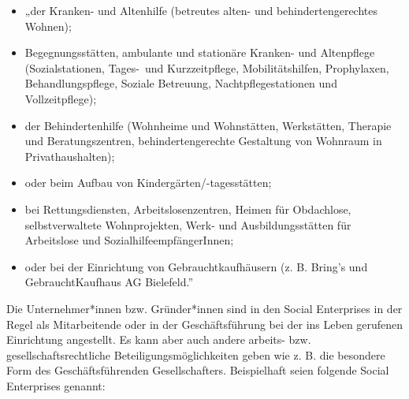 \documentclass[
  letterpaper,
]{book}
\begin{document}
\begin{itemize}
\item
  „der Kranken- und Altenhilfe (betreutes alten- und
  behindertengerechtes Wohnen);
\item
  Begegnungsstätten, ambulante und stationäre Kranken- und Altenpflege
  (Sozialstationen, Tages-~und Kurzzeitpflege, Mobilitätshilfen,
  Prophylaxen, Behandlungspflege, Soziale Betreuung,
  Nachtpflegestationen und Vollzeitpflege);
\item
  der Behindertenhilfe (Wohnheime und Wohnstätten, Werkstätten, Therapie
  und Beratungszentren, behindertengerechte Gestaltung von Wohnraum in
  Privathaushalten);
\item
  oder beim Aufbau von Kindergärten/-tagesstätten;
\item
  bei Rettungsdiensten, Arbeitslosenzentren, Heimen für Obdachlose,
  selbstverwaltete Wohnprojekten, Werk- und Ausbildungsstätten für
  Arbeitslose und SozialhilfeempfängerInnen;
\item
  oder bei der Einrichtung von Gebrauchtkaufhäusern (z. B. Bring's und
  GebrauchtKaufhaus AG Bielefeld.''
\end{itemize}

Die Unternehmer*innen bzw. Gründer*innen sind in den Social Enterprises
in der Regel als Mitarbeitende oder in der Geschäftsführung bei der ins
Leben gerufenen Einrichtung angestellt. Es kann aber auch andere
arbeits- bzw. gesellschaftsrechtliche Beteiligungsmöglichkeiten geben
wie z. B. die besondere Form des Geschäftsführenden Gesellschafters.
Beispielhaft seien folgende Social Enterprises genannt:
\end{document}
